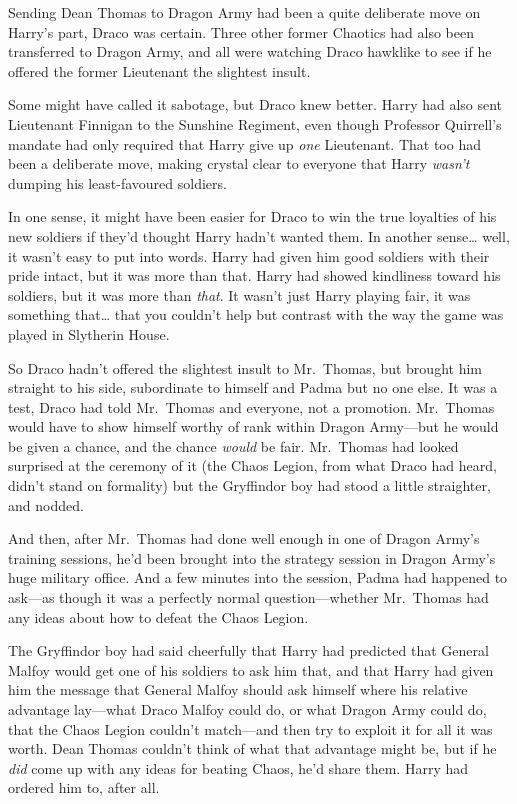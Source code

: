Sending Dean Thomas to Dragon Army had been a quite deliberate move on
Harry's part, Draco was certain. Three other former Chaotics had also
been transferred to Dragon Army, and all were watching Draco hawklike to
see if he offered the former Lieutenant the slightest insult.

Some might have called it sabotage, but Draco knew better. Harry had
also sent Lieutenant Finnigan to the Sunshine Regiment, even though
Professor Quirrell's mandate had only required that Harry give up
\emph{one} Lieutenant. That too had been a deliberate move, making
crystal clear to everyone that Harry \emph{wasn't} dumping his
least-favoured soldiers.

In one sense, it might have been easier for Draco to win the true
loyalties of his new soldiers if they'd thought Harry hadn't wanted
them. In another sense\ldots{} well, it wasn't easy to put into words.
Harry had given him good soldiers with their pride intact, but it was
more than that. Harry had showed kindliness toward his soldiers, but it
was more than \emph{that}. It wasn't just Harry playing fair, it was
something that\ldots{} that you couldn't help but contrast with the way
the game was played in Slytherin House.

So Draco hadn't offered the slightest insult to Mr.~Thomas, but brought
him straight to his side, subordinate to himself and Padma but no one
else. It was a test, Draco had told Mr.~Thomas and everyone, not a
promotion. Mr.~Thomas would have to show himself worthy of rank within
Dragon Army---but he would be given a chance, and the chance
\emph{would} be fair. Mr.~Thomas had looked surprised at the ceremony of
it (the Chaos Legion, from what Draco had heard, didn't stand on
formality) but the Gryffindor boy had stood a little straighter, and
nodded.

And then, after Mr.~Thomas had done well enough in one of Dragon Army's
training sessions, he'd been brought into the strategy session in Dragon
Army's huge military office. And a few minutes into the session, Padma
had happened to ask---as though it was a perfectly normal
question---whether Mr.~Thomas had any ideas about how to defeat the
Chaos Legion.

The Gryffindor boy had said cheerfully that Harry had predicted that
General Malfoy would get one of his soldiers to ask him that, and that
Harry had given him the message that General Malfoy should ask himself
where his relative advantage lay---what Draco Malfoy could do, or what
Dragon Army could do, that the Chaos Legion couldn't match---and then
try to exploit it for all it was worth. Dean Thomas couldn't think of
what that advantage might be, but if he \emph{did} come up with any
ideas for beating Chaos, he'd share them. Harry had ordered him to,
after all.

